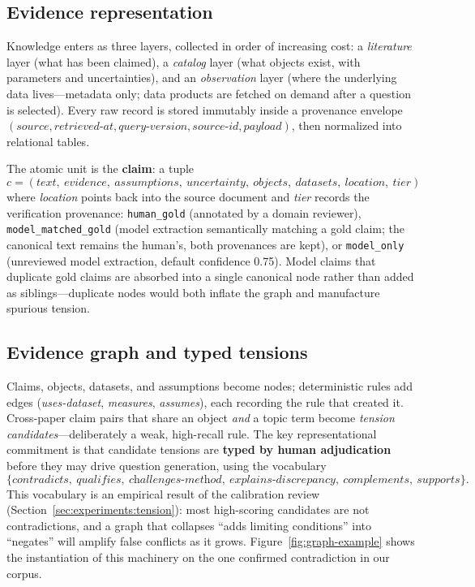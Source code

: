 \subsection{Evidence representation}
\label{sec:framework:evidence}

Knowledge enters as three layers, collected in order of increasing cost:
a \emph{literature} layer (what has been claimed), a \emph{catalog}
layer (what objects exist, with parameters and uncertainties), and an
\emph{observation} layer (where the underlying data lives---metadata
only; data products are fetched on demand after a question is selected).
Every raw record is stored immutably inside a provenance envelope
$(\textit{source}, \textit{retrieved-at}, \textit{query-version},
\textit{source-id}, \textit{payload})$, then normalized into relational
tables.

The atomic unit is the \textbf{claim}: a tuple
\[
c = (\textit{text},\ \textit{evidence},\ \textit{assumptions},\
     \textit{uncertainty},\ \textit{objects},\ \textit{datasets},\
     \textit{location},\ \textit{tier})
\]
where \textit{location} points back into the source document and
\textit{tier} records the verification provenance:
\texttt{human\_gold} (annotated by a domain reviewer),
\texttt{model\_matched\_gold} (model extraction semantically matching a
gold claim; the canonical text remains the human's, both provenances are
kept), or \texttt{model\_only} (unreviewed model extraction, default
confidence 0.75). Model claims that duplicate gold claims are absorbed
into a single canonical node rather than added as siblings---duplicate
nodes would both inflate the graph and manufacture spurious tension.

\subsection{Evidence graph and typed tensions}
\label{sec:framework:graph}

Claims, objects, datasets, and assumptions become nodes; deterministic
rules add edges (\textit{uses-dataset}, \textit{measures},
\textit{assumes}), each recording the rule that created it. Cross-paper
claim pairs that share an object \emph{and} a topic term become
\emph{tension candidates}---deliberately a weak, high-recall rule. The
key representational commitment is that candidate tensions are
\textbf{typed by human adjudication} before they may drive question
generation, using the vocabulary
\[
\{\textit{contradicts},\ \textit{qualifies},\
  \textit{challenges-method},\ \textit{explains-discrepancy},\
  \textit{complements},\ \textit{supports}\}.
\]
This vocabulary is an empirical result of the calibration review
(Section~\ref{sec:experiments:tension}): most high-scoring candidates
are not contradictions, and a graph that collapses ``adds limiting
conditions'' into ``negates'' will amplify false conflicts as it grows.
Figure~\ref{fig:graph-example} shows the instantiation of this
machinery on the one confirmed contradiction in our corpus.

